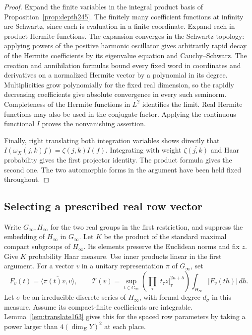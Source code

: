 \documentclass[a4paper,11pt]{article}
\theoremstyle{definition}
\theoremstyle{remark}
\numberwithin{equation}{section}
\begin{document}
\begin{proof}
Expand the finite variables in the integral product basis of
Proposition~\ref{prop:depth245}. The finitely many coefficient
functions at infinity are Schwartz, since each is evaluation in a
finite coordinate. Expand each in product Hermite functions. The
expansion converges in the Schwartz topology: applying powers of the
positive harmonic oscillator gives arbitrarily rapid decay of the
Hermite coefficients by its eigenvalue equation and Cauchy--Schwarz.
The creation and annihilation formulas bound every fixed word in
coordinates and derivatives on a normalized Hermite vector by a
polynomial in its degree. Multiplicities grow polynomially for the
fixed real dimension, so the rapidly decreasing coefficients give
absolute convergence in every such seminorm. Completeness of the
Hermite functions in \(L^2\) identifies the limit. Real Hermite
functions may also be used in the conjugate factor. Applying the
continuous functional \(I\) proves the nonvanishing assertion.

Finally, right translating both integration variables shows directly
that \(I(\omega_X(j,k)f)=\zeta(j,k)I(f)\). Integrating with weight
\(\overline{\zeta(j,k)}\) and Haar probability gives the first
projector identity. The product formula gives the second one.
The two automorphic forms in the argument have been held fixed
throughout.
\end{proof}

\subsection{Selecting a prescribed real row vector}\label{nav:VIII-37}
Write \(G_\infty,H_\infty\) for the two real groups in the first
restriction, and suppress the embedding of \(H_\infty\) in
\(G_\infty\). Let \(K\) be the product of the standard maximal
compact subgroups of \(H_\infty\). Its elements preserve the
Euclidean norms and fix \(z\). Give \(K\) probability Haar measure.
Use inner products linear in the first argument. For a vector
\(v\) in a unitary representation \(\pi\) of \(G_\infty\), set
\[
 F_v(t)=\overline{\langle\pi(t)v,v\rangle},\qquad
 \mathcal T(v)=\sup_{t\in G_\infty}
    \left(\prod_\tau|t_\tau z|_\tau^{2n+5}\right)
                         \int_{H_\infty}|F_v(th)|\,dh .
\]
Let \(\sigma\) be an irreducible discrete series of \(H_\infty\),
with formal degree \(d_\sigma\) in this measure. Assume its
compact-finite coefficients are integrable. Lemma~\ref{lem:translate163}
gives this for the spaced row parameters by taking a power larger
than \(4(\dim_EY)^2\) at each place.
\end{document}
